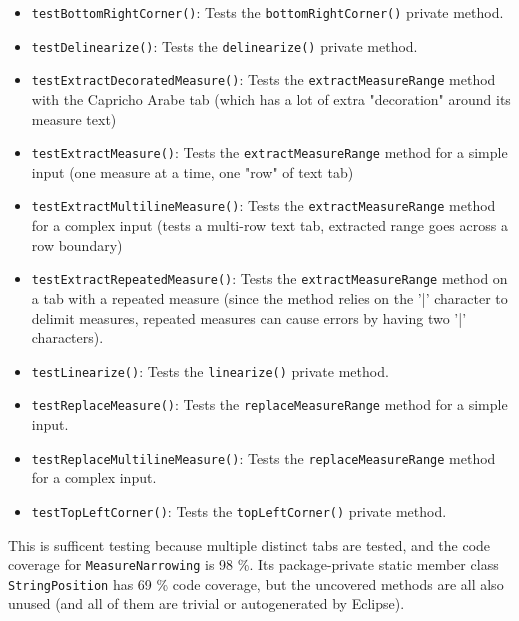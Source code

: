 \documentclass[11pt]{article}
\begin{document}
\begin{itemize}
\item \texttt{testBottomRightCorner()}: Tests the \texttt{bottomRightCorner()} private method.\\
\item \texttt{testDelinearize()}: Tests the \texttt{delinearize()} private method.\\
\item \texttt{testExtractDecoratedMeasure()}: Tests the \texttt{extractMeasureRange} method with the Capricho Arabe tab (which has a lot of extra "decoration" around its measure text)\\
\item \texttt{testExtractMeasure()}: Tests the \texttt{extractMeasureRange} method for a simple input (one measure at a time, one "row" of text tab)\\
\item \texttt{testExtractMultilineMeasure()}: Tests the \texttt{extractMeasureRange} method for a complex input (tests a multi-row text tab, extracted range goes across a row boundary)\\
\item \texttt{testExtractRepeatedMeasure()}: Tests the \texttt{extractMeasureRange} method on a tab with a repeated measure (since the method relies on the '|' character to delimit measures, repeated measures can cause errors by having two '|' characters).\\
\item \texttt{testLinearize()}: Tests the \texttt{linearize()} private method.\\
\item \texttt{testReplaceMeasure()}: Tests the \texttt{replaceMeasureRange} method for a simple input.\\
\item \texttt{testReplaceMultilineMeasure()}: Tests the \texttt{replaceMeasureRange} method for a complex input.\\
\item \texttt{testTopLeftCorner()}: Tests the \texttt{topLeftCorner()} private method.\\
\end{itemize}

This is sufficent testing because multiple distinct tabs are tested, and the code coverage for \texttt{MeasureNarrowing} is 98 \%.  Its package-private static member class \texttt{StringPosition} has 69 \% code coverage, but the uncovered methods are all also unused (and all of them are trivial or autogenerated by Eclipse).\\
\end{document}
